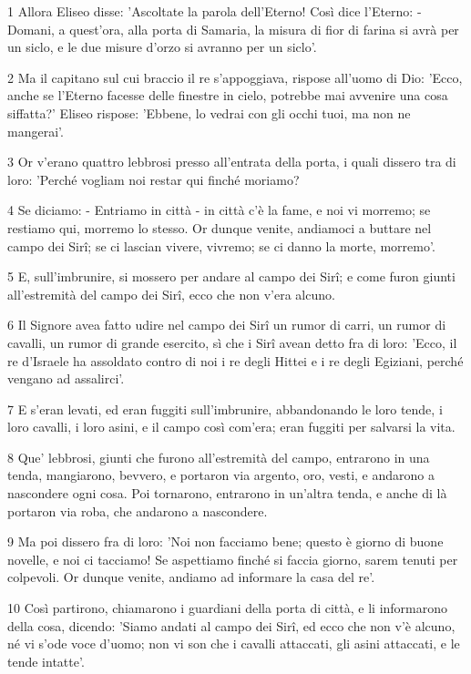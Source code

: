 \par 1 Allora Eliseo disse: 'Ascoltate la parola dell'Eterno! Così dice l'Eterno: - Domani, a quest'ora, alla porta di Samaria, la misura di fior di farina si avrà per un siclo, e le due misure d'orzo si avranno per un siclo'.
\par 2 Ma il capitano sul cui braccio il re s'appoggiava, rispose all'uomo di Dio: 'Ecco, anche se l'Eterno facesse delle finestre in cielo, potrebbe mai avvenire una cosa siffatta?' Eliseo rispose: 'Ebbene, lo vedrai con gli occhi tuoi, ma non ne mangerai'.
\par 3 Or v'erano quattro lebbrosi presso all'entrata della porta, i quali dissero tra di loro: 'Perché vogliam noi restar qui finché moriamo?
\par 4 Se diciamo: - Entriamo in città - in città c'è la fame, e noi vi morremo; se restiamo qui, morremo lo stesso. Or dunque venite, andiamoci a buttare nel campo dei Sirî; se ci lascian vivere, vivremo; se ci danno la morte, morremo'.
\par 5 E, sull'imbrunire, si mossero per andare al campo dei Sirî; e come furon giunti all'estremità del campo dei Sirî, ecco che non v'era alcuno.
\par 6 Il Signore avea fatto udire nel campo dei Sirî un rumor di carri, un rumor di cavalli, un rumor di grande esercito, sì che i Sirî avean detto fra di loro: 'Ecco, il re d'Israele ha assoldato contro di noi i re degli Hittei e i re degli Egiziani, perché vengano ad assalirci'.
\par 7 E s'eran levati, ed eran fuggiti sull'imbrunire, abbandonando le loro tende, i loro cavalli, i loro asini, e il campo così com'era; eran fuggiti per salvarsi la vita.
\par 8 Que' lebbrosi, giunti che furono all'estremità del campo, entrarono in una tenda, mangiarono, bevvero, e portaron via argento, oro, vesti, e andarono a nascondere ogni cosa. Poi tornarono, entrarono in un'altra tenda, e anche di là portaron via roba, che andarono a nascondere.
\par 9 Ma poi dissero fra di loro: 'Noi non facciamo bene; questo è giorno di buone novelle, e noi ci tacciamo! Se aspettiamo finché si faccia giorno, sarem tenuti per colpevoli. Or dunque venite, andiamo ad informare la casa del re'.
\par 10 Così partirono, chiamarono i guardiani della porta di città, e li informarono della cosa, dicendo: 'Siamo andati al campo dei Sirî, ed ecco che non v'è alcuno, né vi s'ode voce d'uomo; non vi son che i cavalli attaccati, gli asini attaccati, e le tende intatte'.
